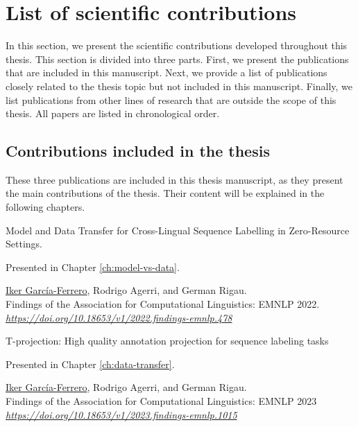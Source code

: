 \clearpage


\section{List of scientific contributions}

In this section, we present the scientific contributions developed throughout this thesis. This section is divided into three parts. First, we present the publications that are included in this manuscript. Next, we provide a list of publications closely related to the thesis topic but not included in this manuscript. Finally, we list publications from other lines of research that are outside the scope of this thesis. All papers are listed in chronological order.
\clearpage
\subsection{Contributions included in the thesis}
\label{publi}

These three publications are included in this thesis manuscript, as they present the main contributions of the thesis. Their content will be explained in the following chapters.

\begin{part_of_the_thesis}{Model and Data Transfer for Cross-Lingual Sequence Labelling in Zero-Resource Settings.}
    \begin{smallbox}
     Presented in Chapter \ref{ch:model-vs-data}.
    \end{smallbox}
    \underline{Iker García-Ferrero}, Rodrigo Agerri, and German Rigau. \\
    Findings of the Association for Computational Linguistics: EMNLP 2022. \\
    \textit{\href{https://doi.org/10.18653/v1/2022.findings-emnlp.478}{https://doi.org/10.18653/v1/2022.findings-emnlp.478}}
    \end{part_of_the_thesis}

\begin{part_of_the_thesis}{T-projection: High quality annotation projection for sequence labeling tasks}
        \begin{smallbox}
         Presented in Chapter \ref{ch:data-transfer}.
        \end{smallbox}
        \underline{Iker García-Ferrero}, Rodrigo Agerri, and German Rigau. \\
        Findings of the Association for Computational Linguistics: EMNLP 2023 \\
        \textit{\href{https://doi.org/10.18653/v1/2023.findings-emnlp.1015}{https://doi.org/10.18653/v1/2023.findings-emnlp.1015}}
        \end{part_of_the_thesis}

